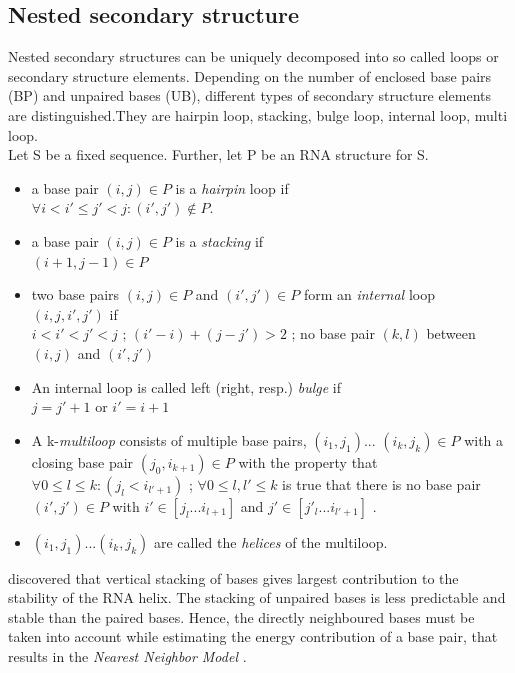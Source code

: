 \documentclass[twoside,a4paper]{report}
\begin{document}
	\subsection{Nested secondary structure}
	Nested secondary structures can be uniquely decomposed into so called loops or secondary structure elements. Depending on the number of enclosed base pairs (BP) and unpaired bases (UB), different types of secondary structure elements are distinguished.They are hairpin loop, stacking, bulge loop, internal loop, multi loop. \\
	Let S be a fixed sequence. Further, let P be an RNA structure for S.
	\begin{itemize}
		\item a base pair $( i, j ) \in P$ is a \textit{hairpin} loop if\\
			$	\forall i < i' \leq j' < j : (i', j') \notin P. $

		\item a base pair $( i, j ) \in P$ is a \textit{stacking} if\\
		$(i + 1 , j - 1 ) \in P $
		\item two base pairs $ (i, j) \in P$ and $(i' ,j' ) \in P$ form  an \textit{internal} loop $(i,j,i',j')$ if \\
		$i < i' < j' < j $ ; $ (i' - i)+( j - j') > 2$ ; no base pair $(k,l)$ between $(i, j)$ and $(i',j')$
		\item An internal loop is called left (right, resp.) \textit{bulge} if\\
		$ j = j' +1 $ or $ i' = i+1$
		\item A k-\textit{multiloop} consists of multiple base pairs, $(i_1,j_1)$... $(i_k,j_k) \in P$ with a closing base pair $(j_0, i_{k+1}) \in P$ with the property that \\
		$\forall 0 \leq l \leq k : ( j_l < i_{l'+1})$ ; $\forall 0 \leq l , l' \leq k$ is true that there is no base pair $(i' ,j') \in P$ with $i' \in [j_l...i_{l+1}]$ and $j' \in [j'_l...i_{l'+1}]$ .
		\item $(i_1,j_1)...(i_k, j_k)$ are called the \textit{helices} of the multiloop.\\
 	\end{itemize}
 
 
 	 \citeauthor{DeVoe1962TheSO} discovered that vertical stacking of bases gives largest contribution to the stability of the RNA helix. The stacking of unpaired bases is less predictable and stable than the paired bases. Hence, the directly neighboured bases must be taken into account while estimating the energy contribution of a  base pair, that results in the \textit{Nearest Neighbor Model} \citep{borer1974stability}.\\
 	 
\end{document}
